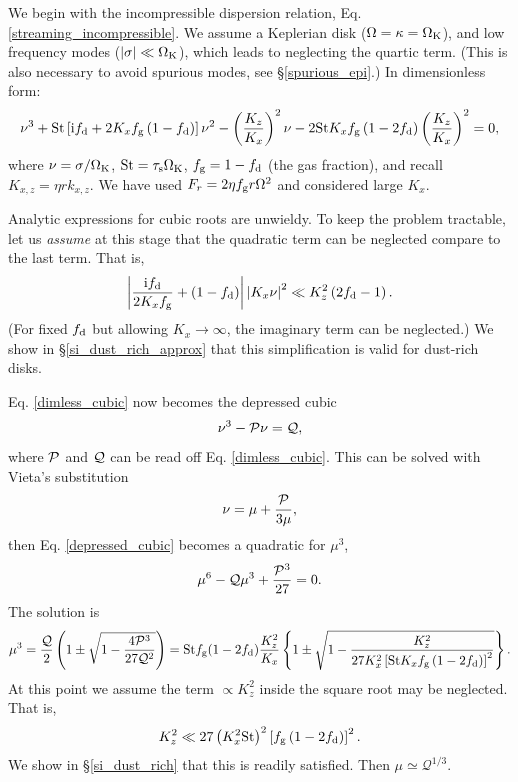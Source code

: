 We begin with the incompressible dispersion
relation, Eq. \ref{streaming_incompressible}. We assume a Keplerian
disk ($\Omega=\kappa=\Omega_{\rm K}$), and low frequency  modes 
($|\sigma|\ll \Omega_{\rm K}$), which leads to neglecting the quartic  
term. (This is also necessary to avoid spurious modes, see
\S\ref{spurious_epi}.)  In dimensionless form:   
\begin{align}
  \nu^3 + \mathrm{St}\left[\mathrm{i}f_\mathrm{d} + 2 K_x f_\mathrm{g} \left(1-f_\mathrm{d}\right)\right]\nu^2
  - \left(\frac{K_z}{K_x}\right)^2\nu - 2\mathrm{St} K_x f_\mathrm{g}
  \left(1-2f_\mathrm{d}\right)\left(\frac{K_z}{K_x}\right)^2 = 0,\label{dimless_cubic}
\end{align}
where $\nu = \sigma/\Omega_{\rm K}$, $\mathrm{St} = \tau_\mathrm{s}\Omega_{\rm K}$, $f_\mathrm{g} = 1-f_\mathrm{d}$ (the gas
fraction), and recall $K_{x,z}=\eta r k_{x,z}$. We have used $F_r =
2\eta f_\mathrm{g} r \Omega^2$ and considered large $K_x$.  

Analytic expressions for cubic roots are unwieldy. To keep the problem
tractable, let us \emph{assume} at this stage that the quadratic term
can be neglected compare to the last term. That is, 
\begin{align}
\left|\frac{\mathrm{i}f_\mathrm{d}}{2K_xf_\mathrm{g}} + \left(1 -
      f_\mathrm{d}\right)\right| \left|K_x\nu\right|^2 \ll
  K_z^2\left(2f_\mathrm{d} - 1\right). \label{min_kz}
\end{align}
(For fixed $f_\mathrm{d}$ but allowing $K_x\to\infty$, the imaginary term can be
neglected.) We show in \S\ref{si_dust_rich_approx} that this
simplification is valid for dust-rich disks.  

Eq. \ref{dimless_cubic} now becomes the depressed cubic 
\begin{align}
  \nu^3 - \mathcal{P} \nu = \mathcal{Q}, \label{depressed_cubic}
\end{align}
where $\mathcal{P}$ and $\mathcal{Q}$ can be read off Eq. \ref{dimless_cubic}. This can be
solved with Vieta's substitution 
\begin{align}
\nu = \mu + \frac{\mathcal{P}}{3\mu},\label{si_vieta}
\end{align}
then Eq. \ref{depressed_cubic} becomes a quadratic for $\mu^3$,
\begin{align}
\mu^6 - \mathcal{Q}\mu^3 + \frac{\mathcal{P}^3}{27} = 0. 
\end{align}
The solution is
\begin{align}
  \mu^3 = \frac{\mathcal{Q}}{2}\left(1\pm \sqrt{1 -
      \frac{4\mathcal{P}^3}{27\mathcal{Q}^2}}\right) 
   = \mathrm{St} f_\mathrm{g} (1- 2f_\mathrm{d})\frac{K_z^2}{K_x}\left\{1 \pm \sqrt{1 -
      \frac{K_z^2}{27K_x^2\left[\mathrm{St} K_x f_\mathrm{g}
          \left(1-2f_\mathrm{d}\right)\right]^2}}\right\}.  
\end{align}
At this point we assume the term $\propto K_z^2$ inside the square
root may be neglected. That is, 
\begin{align}
  K_z^2 \ll 27 \left(K_x^2\mathrm{St}\right)^2 \left[f_\mathrm{g}
          \left(1-2f_\mathrm{d}\right)\right]^2. \label{max_kz}
\end{align}
We show in \S\ref{si_dust_rich} that this is readily satisfied. Then
$\mu \simeq \mathcal{Q}^{1/3}$.  

